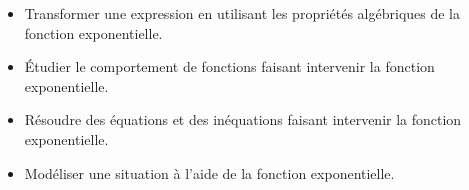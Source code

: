 \documentclass[12pt]{article}
\theoremstyle{break}
\begin{document}
\begin{savoir}{}{}
\begin{itemize}
  \item Transformer une expression en utilisant les propriétés algébriques de la fonction exponentielle.
  \item Étudier le comportement de fonctions faisant intervenir la fonction exponentielle.
  \item Résoudre des équations et des inéquations faisant intervenir la fonction exponentielle.
  \item Modéliser une situation à l'aide de la fonction exponentielle.
\end{itemize}
\end{savoir}
\end{document}
